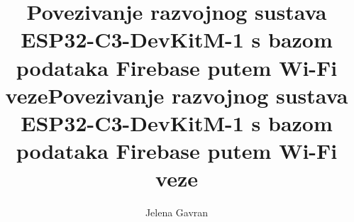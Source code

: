 \documentclass[times, utf8, seminar, numeric]{fer}
\begin{document}
\title{Povezivanje razvojnog sustava ESP32-C3-DevKitM-1 s bazom podataka Firebase putem Wi-Fi veze}

\author{Jelena Gavran}


\maketitle

\tableofcontents

\begingroup
\renewcommand*\listfigurename{Popis slika}
\listoffigures
\endgroup












\title{Povezivanje razvojnog sustava ESP32-C3-DevKitM-1 s bazom podataka Firebase putem Wi-Fi veze}
\begin{sazetak}
	
\end{sazetak}
\end{document}

